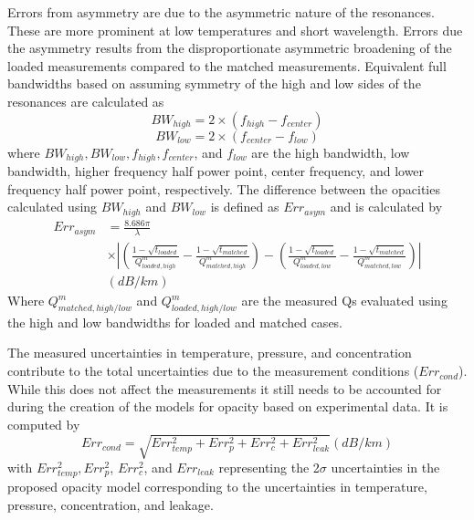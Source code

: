 Errors from asymmetry are due to the asymmetric nature of the resonances. These are more prominent at low temperatures and short wavelength. Errors due the asymmetry results from the disproportionate asymmetric broadening of the loaded measurements compared to the matched measurements. Equivalent full bandwidths based on assuming symmetry of the high and low sides of the resonances are calculated as
\begin{equation}
BW_{high} = 2 \times (f_{high} - f_{center})
\end{equation}
\begin{equation}
BW_{low} = 2 \times (f_{center} - f_{low})
\end{equation}
where $BW_{high}, BW_{low}, f_{high}, f_{center}$, and $f_{low}$ are the high bandwidth, low bandwidth, higher frequency half power point, center frequency, and lower frequency half power point, respectively. The difference between the opacities calculated using $BW_{high}$ and $BW_{low}$ is defined as $Err_{asym}$ and is calculated by
\begin{equation}
\begin{split}
Err_{asym} &= \frac{8.686 \pi}{\lambda} 
\\ &\times \left| \left( \frac{1-\sqrt{t_{loaded}}}{Q^m_{loaded,high}} - \frac{1-\sqrt{t_{matched}}}{Q^m_{matched,high}} \right) - \left( \frac{1-\sqrt{t_{loaded}}}{Q^m_{loaded,low}} - \frac{1-\sqrt{t_{matched}}}{Q^m_{matched,low}} \right) \right|\\
 &(dB/km)
\end{split}
\end{equation}
Where $Q^m_{matched,high/low}$ and $Q^m_{loaded,high/low}$ are the measured Qs evaluated using the high and low bandwidths for loaded and matched cases. 

The measured uncertainties in temperature, pressure, and concentration contribute to the total uncertainties due to the measurement conditions ($Err_{cond}$). While this does not affect the measurements it still needs to be accounted for during the creation of the models for opacity based on experimental data. It is computed by
\begin{equation}
Err_{cond} = \sqrt{Err_{temp}^2 + Err_{p}^2 + Err_{c}^2 + Err_{leak}^2} (dB/km)
\end{equation}
with $Err_{temp}^2, Err_{p}^2 $, $ Err_{c}^2$, and $Err_{leak}$ representing the 2$\sigma$ uncertainties in the proposed opacity model corresponding to the uncertainties in temperature, pressure, concentration, and leakage. 

